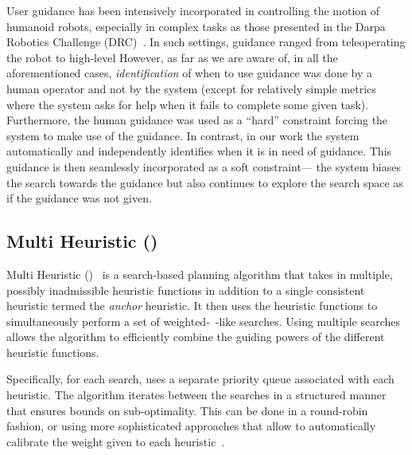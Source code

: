 \documentclass{article}
\begin{document}
User guidance has been intensively incorporated in controlling the motion of humanoid robots, especially in complex tasks as those presented in the Darpa Robotics Challenge (DRC)~\cite{drc18}.
In such settings, guidance ranged from teleoperating the robot 
to high-level 
However, as far as we are aware of, in all the aforementioned cases, \emph{identification} of when to use guidance was done by a human operator and not by the system (except for relatively simple metrics where the system asks for help when it fails to complete some given task).
Furthermore, the human guidance was used as a ``hard'' constraint forcing the system to make use of the guidance.
In contrast, in our work the system automatically and independently identifies when it is in need of guidance.
This guidance is then seamlessly incorporated as a soft constraint--- the system biases the search towards the guidance but also continues to explore the search space as if the guidance was not given.

 
\subsection{Multi Heuristic \astar (\mhastar)}
\label{sec:mha}
Multi Heuristic \astar (\mhastar)~\cite{NAL15,ASNHL16} is a search-based planning algorithm that takes in multiple, possibly inadmissible heuristic functions in addition to a single consistent heuristic termed the \emph{anchor} heuristic.
It then uses the heuristic functions to simultaneously perform a set of weighted-\astar~\cite{pohl1970first}-like searches.
Using multiple searches allows the algorithm to efficiently combine the guiding powers of the different heuristic functions. 

Specifically, for each search, \mhastar uses a separate priority queue associated with each heuristic. 
The algorithm iterates between the searches in a structured manner that ensures bounds on sub-optimality. 
This can be done in a round-robin fashion, or using more 
sophisticated approaches that allow to automatically calibrate the weight given to each heuristic~\cite{PNAL15}.
\end{document}
